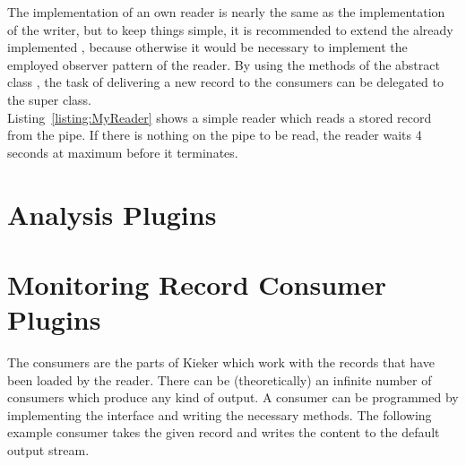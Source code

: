 \noindent The implementation of an own reader is nearly the same as the implementation of the writer, but to keep things simple, it is recommended to extend the already implemented , because otherwise it would be necessary to implement the employed observer pattern of the reader. By using the methods of the abstract class , the task of delivering a new record to the consumers can be delegated to the super class.\\
Listing~\ref{listing:MyReader} shows a simple reader which reads a stored record from the pipe. If there is nothing on the pipe to be read, the reader waits 4 seconds at maximum before it terminates.

\setJavaCodeListing


\section{Analysis Plugins}\label{sec:analysis:plugins}


\section{Monitoring Record Consumer Plugins}\label{sec:analysis:consumer}

The consumers are the parts of Kieker which work with the records that have been loaded by the reader. There can be (theoretically) an infinite number of consumers which produce any kind of output. A consumer can be programmed by implementing the interface  and writing the necessary methods. The following example consumer takes the given record and writes the content to the default output stream.

\setJavaCodeListing

